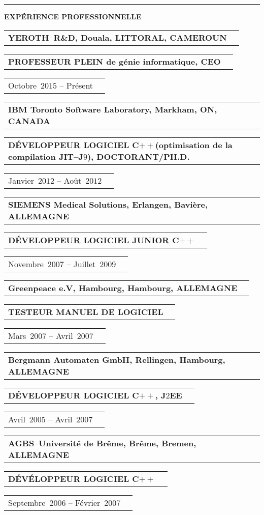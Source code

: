 \documentclass[9pt,a4paper]{article} %
\makeatletter
\newcommand{\headerrow}[2]
{\begin{tabular*}{\linewidth}{l@{\extracolsep{\fill}}r}
	#1 &
	#2 \\
\end{tabular*}}
\newcommand{\headerrowONE}[1]{\headerrow{#1}{}}
\newcommand{\jtwoee}{J$2$EE\xspace}
\newcommand{\cplusplus}{C$++$\xspace}
\newcommand{\cvitemdate}[2]{#1~$#2$\xspace}
\newcommand{\cvitempositionheld}[1]{\textbf{#1}\xspace}
\makeatother
\begin{document}
\vspace{1em}


\hrule
\begin{center}
{\large \textbf{EXPÉRIENCE PROFESSIONNELLE}}
\end{center}

\vspace{0.5em}

\headerrowONE{\textbf{YEROTH~R\&D, Douala, LITTORAL, CAMEROUN}}
\headerrowONE{\cvitempositionheld{PROFESSEUR PLEIN de génie informatique, CEO}}
\headerrowONE{\cvitemdate{Octobre}{2015} -- Présent}	
	
\vspace{0.3em}

\headerrowONE{\textbf{IBM Toronto Software Laboratory, Markham, ON, CANADA}}	
\headerrowONE{\cvitempositionheld{DÉVELOPPEUR LOGICIEL \cplusplus (optimisation de la compilation JIT--J$9$), DOCTORANT/PH.D.}}
\headerrowONE{\cvitemdate{Janvier}{2012} -- \cvitemdate{Août}{2012}}	

\vspace{0.3em}

\headerrowONE{\textbf{SIEMENS Medical Solutions, Erlangen, Bavière, ALLEMAGNE}}	
\headerrowONE{\cvitempositionheld{DÉVELOPPEUR LOGICIEL JUNIOR \cplusplus}}
\headerrowONE{\cvitemdate{Novembre}{2007} -- \cvitemdate{Juillet}{2009}}	
	
\vspace{0.3em}

\headerrowONE{\textbf{Greenpeace e.V, Hambourg, Hambourg, ALLEMAGNE}}	
\headerrowONE{\cvitempositionheld{TESTEUR MANUEL DE LOGICIEL}}
\headerrowONE{\cvitemdate{Mars}{2007} -- \cvitemdate{Avril}{2007}}	

\vspace{0.3em}

\headerrowONE{\textbf{Bergmann Automaten GmbH, Rellingen, Hambourg, ALLEMAGNE}}	
\headerrowONE{\cvitempositionheld{DÉVELOPPEUR LOGICIEL \cplusplus, \jtwoee}}
\headerrowONE{\cvitemdate{Avril}{2005} -- \cvitemdate{Avril}{2007}}	
	
\vspace{0.3em}

\headerrowONE{\textbf{AGBS--Université de Brême, Brême, Bremen, ALLEMAGNE}}	
\headerrowONE{\cvitempositionheld{DÉVÉLOPPEUR LOGICIEL \cplusplus}}
\headerrowONE{\cvitemdate{Septembre}{2006} -- \cvitemdate{Février}{2007}}	

\vspace{0.3em}
\end{document}
